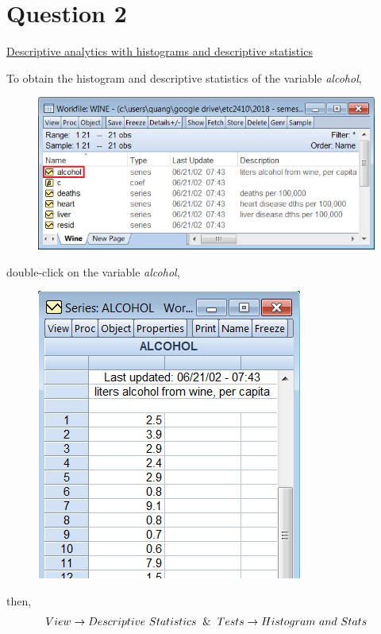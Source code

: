 \documentclass[12pt]{report}
\begin{document}
	\section*{Question 2}
	\underline{Descriptive analytics with histograms and descriptive statistics}	
		
		\noindent To obtain the histogram and descriptive statistics of the variable \textit{alcohol}, 
		\begin{figure}[H]
			\centering
			\includegraphics{q2_1}
		\end{figure} \vspace{-\baselineskip}
		\justify		
		\noindent double-click on the variable \textit{alcohol},
		
		\begin{figure}[H]
			\centering
			\includegraphics{alcohol}
		\end{figure} \vspace{-\baselineskip}
		\justify
		\noindent then,
		$$View \to Descriptive\ Statistics \And Tests \to Histogram\ and\ Stats$$
		
\end{document}
